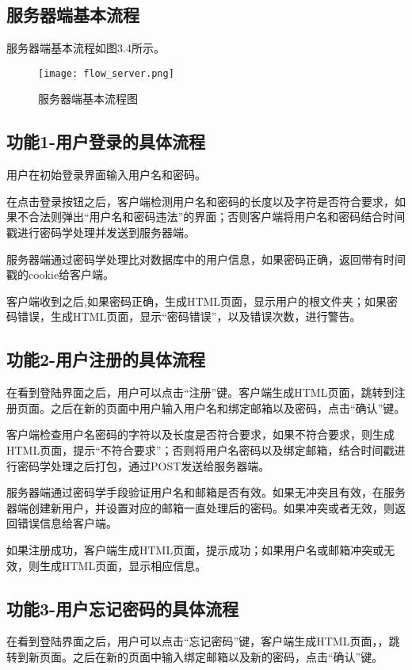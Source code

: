 \subsection{服务器端基本流程}
服务器端基本流程如图3.4所示。
\begin{figure}[!ht] 
\centering
\texttt{[image: flow\_server.png]}
\caption{服务器端基本流程图}\label{fig:noted-figure}
\end{figure} 



\subsection{功能1-用户登录的具体流程} 

用户在初始登录界面输入用户名和密码。

在点击登录按钮之后，客户端检测用户名和密码的长度以及字符是否符合要求，如果不合法则弹出“用户名和密码违法”的界面；否则客户端将用户名和密码结合时间戳进行密码学处理并发送到服务器端。

服务器端通过密码学处理比对数据库中的用户信息，如果密码正确，返回带有时间戳的cookie给客户端。

客户端收到之后,如果密码正确，生成HTML页面，显示用户的根文件夹；如果密码错误，生成HTML页面，显示“密码错误”，以及错误次数，进行警告。

\subsection{功能2-用户注册的具体流程}

在看到登陆界面之后，用户可以点击“注册”键。客户端生成HTML页面，跳转到注册页面。之后在新的页面中用户输入用户名和绑定邮箱以及密码，点击“确认”键。

客户端检查用户名密码的字符以及长度是否符合要求，如果不符合要求，则生成HTML页面，提示“不符合要求”；否则将用户名密码以及绑定邮箱，结合时间戳进行密码学处理之后打包，通过POST发送给服务器端。

服务器端通过密码学手段验证用户名和邮箱是否有效。如果无冲突且有效，在服务器端创建新用户，并设置对应的邮箱一直处理后的密码。如果冲突或者无效，则返回错误信息给客户端。

如果注册成功，客户端生成HTML页面，提示成功；如果用户名或邮箱冲突或无效，则生成HTML页面，显示相应信息。

\subsection{功能3-用户忘记密码的具体流程}
在看到登陆界面之后，用户可以点击“忘记密码”键，客户端生成HTML页面，，跳转到新页面。之后在新的页面中输入绑定邮箱以及新的密码，点击“确认”键。

